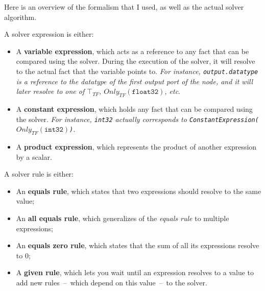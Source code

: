 \documentclass[11pt]{article}
\begin{document}
Here is an overview of the formalism that I used, as well as the actual solver algorithm.\\

\begin{definition}
A solver expression is either:
\begin{itemize}
    \item A \textbf{variable expression}, which acts as a reference to any fact that can be compared using the solver. During the execution of the solver, it will resolve to the actual fact that the variable points to. \textit{For instance, \texttt{output.datatype} is a reference to the datatype of the first output port of the node, and it will later resolve to one of $\top_{TF}$, $Only_{TF}(\texttt{float32})$, etc}.
    
    \item A \textbf{constant expression}, which holds any fact that can be compared using the solver. \textit{For instance, \texttt{int32} actually corresponds to \texttt{ConstantExpression($Only_{TF}(\texttt{int32})$)}}.
    
    \item A \textbf{product expression}, which represents the product of another expression by a scalar.\\
\end{itemize}
\end{definition}

\begin{definition}
A solver rule is either:
\begin{itemize}[noitemsep]
    \item An \textbf{equals rule}, which states that two expressions should resolve to the same value;
    \item An \textbf{all equals rule}, which generalizes of the \textit{equals rule} to multiple expressions;
    \item An \textbf{equals zero rule}, which states that the sum of all its expressions resolve to $0$;
    \item A \textbf{given rule}, which lets you wait until an expression resolves to a value to add new rules~--~which depend on this value~--~to the solver.
\end{itemize}
\end{definition}
\end{document}
